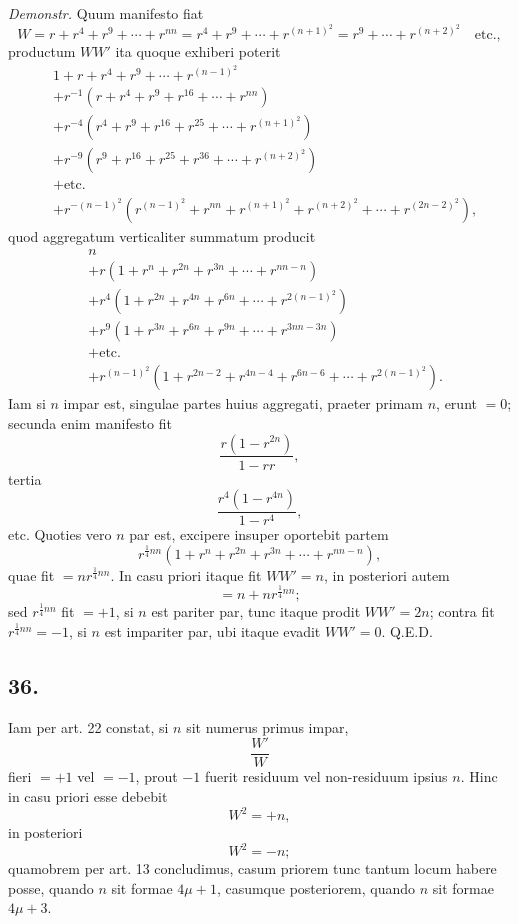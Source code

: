 \documentclass[12pt]{article}
\begin{document}
\emph{Demonstr.} Quum manifesto fiat
\[
W=r+r^4+r^9+\cdots+r^{nn}
=r^4+r^9+\cdots+r^{(n+1)^2}
=r^9+\cdots+r^{(n+2)^2}\quad\text{etc.},
\]
productum $WW'$ ita quoque exhiberi poterit
\[
\begin{aligned}
&1+r+r^4+r^9+\cdots+r^{(n-1)^2}\\
&+r^{-1}(r+r^4+r^9+r^{16}+\cdots+r^{nn})\\
&+r^{-4}(r^4+r^9+r^{16}+r^{25}+\cdots+r^{(n+1)^2})\\
&+r^{-9}(r^9+r^{16}+r^{25}+r^{36}+\cdots+r^{(n+2)^2})\\
&+\text{etc.}\\
&+r^{-(n-1)^2}(r^{(n-1)^2}+r^{nn}+r^{(n+1)^2}+r^{(n+2)^2}+\cdots+r^{(2n-2)^2}),
\end{aligned}
\]
quod aggregatum verticaliter summatum producit
\[
\begin{aligned}
&n\\
&+r(1+r^n+r^{2n}+r^{3n}+\cdots+r^{nn-n})\\
&+r^4(1+r^{2n}+r^{4n}+r^{6n}+\cdots+r^{2(n-1)^2})\\
&+r^9(1+r^{3n}+r^{6n}+r^{9n}+\cdots+r^{3nn-3n})\\
&+\text{etc.}\\
&+r^{(n-1)^2}(1+r^{2n-2}+r^{4n-4}+r^{6n-6}+\cdots+r^{2(n-1)^2}).
\end{aligned}
\]
Iam si $n$ impar est, singulae partes huius aggregati, praeter primam $n$, erunt $=0$; secunda enim manifesto fit
\[
\frac{r(1-r^{2n})}{1-rr},
\]
tertia
\[
\frac{r^4(1-r^{4n})}{1-r^4},
\]
etc. Quoties vero $n$ par est, excipere insuper oportebit partem
\[
r^{\frac14 nn}(1+r^n+r^{2n}+r^{3n}+\cdots+r^{nn-n}),
\]
quae fit $=nr^{\frac14 nn}$. In casu priori itaque fit $WW'=n$, in posteriori autem
\[
=n+nr^{\frac14 nn};
\]
sed $r^{\frac14 nn}$ fit $=+1$, si $n$ est pariter par, tunc itaque prodit $WW'=2n$; contra fit $r^{\frac14 nn}=-1$, si $n$ est impariter par, ubi itaque evadit $WW'=0$. Q.E.D.

\subsection*{36.}

Iam per art. 22 constat, si $n$ sit numerus primus impar,
\[
\frac{W'}{W}
\]
fieri $=+1$ vel $=-1$, prout $-1$ fuerit residuum vel non-residuum ipsius $n$. Hinc in casu priori esse debebit
\[
W^2=+n,
\]
in posteriori
\[
W^2=-n;
\]
quamobrem per art. 13 concludimus, casum priorem tunc tantum locum habere posse, quando $n$ sit formae $4\mu+1$, casumque posteriorem, quando $n$ sit formae $4\mu+3$.
\end{document}
